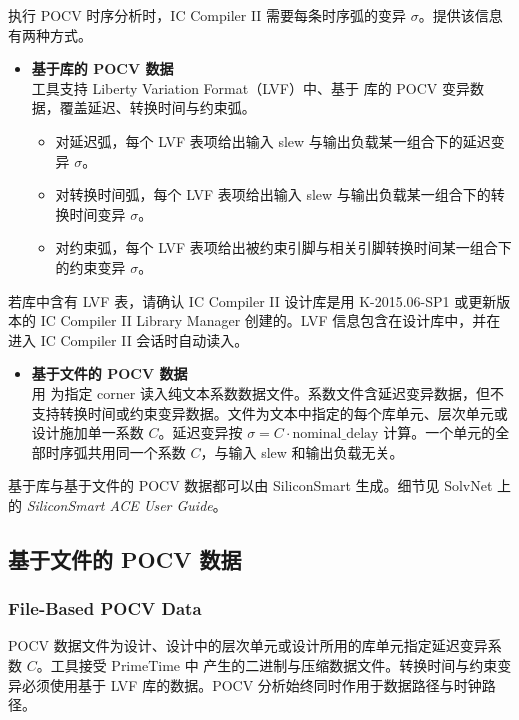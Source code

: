执行 POCV 时序分析时，IC Compiler II 需要每条时序弧的变异 $\sigma$。提供该信息有两种方式。

\begin{itemize}
  \item \textbf{基于库的 POCV 数据}\\
        工具支持 Liberty Variation Format（LVF）中、基于  库的 POCV 变异数据，覆盖延迟、转换时间与约束弧。
  \begin{itemize}
    \item 对延迟弧，每个 LVF 表项给出输入 slew 与输出负载某一组合下的延迟变异 $\sigma$。
    \item 对转换时间弧，每个 LVF 表项给出输入 slew 与输出负载某一组合下的转换时间变异 $\sigma$。
    \item 对约束弧，每个 LVF 表项给出被约束引脚与相关引脚转换时间某一组合下的约束变异 $\sigma$。
  \end{itemize}
\end{itemize}

\begin{noteBox}
若库中含有 LVF 表，请确认 IC Compiler II 设计库是用 K-2015.06-SP1 或更新版本的 IC Compiler II Library Manager 创建的。LVF 信息包含在设计库中，并在进入 IC Compiler II 会话时自动读入。
\end{noteBox}

\begin{itemize}
  \item \textbf{基于文件的 POCV 数据}\\
        用  为指定 corner 读入纯文本系数数据文件。系数文件含延迟变异数据，但不支持转换时间或约束变异数据。文件为文本中指定的每个库单元、层次单元或设计施加单一系数 $C$。延迟变异按 $\sigma = C \cdot \mathrm{nominal\_delay}$ 计算。一个单元的全部时序弧共用同一个系数 $C$，与输入 slew 和输出负载无关。
\end{itemize}

基于库与基于文件的 POCV 数据都可以由 SiliconSmart 生成。细节见 SolvNet 上的 \textit{SiliconSmart ACE User Guide}。

\subsection{基于文件的 POCV 数据}
\subsubsection*{File-Based POCV Data}

POCV 数据文件为设计、设计中的层次单元或设计所用的库单元指定延迟变异系数 $C$。工具接受 PrimeTime 中  产生的二进制与压缩数据文件。转换时间与约束变异必须使用基于 LVF 库的数据。POCV 分析始终同时作用于数据路径与时钟路径。

